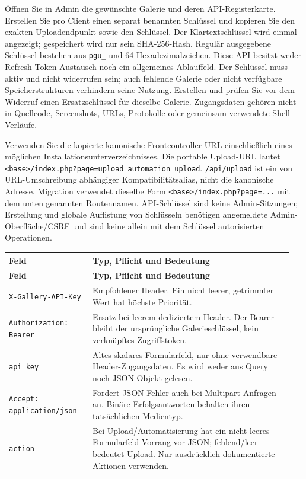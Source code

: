 \documentclass[11pt,a4paper]{article}
\newcommand{\codeword}[1]{\nolinkurl{#1}}
\begin{document}
Öffnen Sie in Admin die gewünschte Galerie und deren API-Registerkarte. Erstellen Sie pro
Client einen separat benannten Schlüssel und kopieren Sie den exakten Uploadendpunkt sowie
den Schlüssel. Der Klartextschlüssel wird einmal angezeigt; gespeichert wird nur sein
SHA-256-Hash. Regulär ausgegebene Schlüssel bestehen aus \codeword{pgu_} und 64
Hexadezimalzeichen. Diese API besitzt weder Refresh-Token-Austausch noch ein allgemeines
Ablauffeld. Der Schlüssel muss aktiv und nicht widerrufen sein; auch fehlende Galerie oder
nicht verfügbare Speicherstrukturen verhindern seine Nutzung. Erstellen und prüfen Sie vor
dem Widerruf einen Ersatzschlüssel für dieselbe Galerie. Zugangsdaten gehören nicht in
Quellcode, Screenshots, URLs, Protokolle oder gemeinsam verwendete Shell-Verläufe.

Verwenden Sie die kopierte kanonische Frontcontroller-URL einschließlich eines möglichen
Installationsunterverzeichnisses. Die portable Upload-URL lautet
\codeword{<base>/index.php?page=upload_automation_upload}. \codeword{/api/upload} ist ein
von URL-Umschreibung abhängiger Kompatibilitätsalias, nicht die kanonische Adresse.
Migration verwendet dieselbe Form \codeword{<base>/index.php?page=...} mit dem unten
genannten Routennamen. API-Schlüssel sind keine Admin-Sitzungen; Erstellung und globale
Auflistung von Schlüsseln benötigen angemeldete Admin-Oberfläche/CSRF und sind keine allein
mit dem Schlüssel autorisierten Operationen.

\begin{longtable}{@{}>{\RaggedRight\arraybackslash}p{0.28\linewidth}>{\RaggedRight\arraybackslash}p{0.67\linewidth}@{}}
\toprule
\textbf{Feld} & \textbf{Typ, Pflicht und Bedeutung} \\
\midrule
\endfirsthead
\toprule
\textbf{Feld} & \textbf{Typ, Pflicht und Bedeutung} \\
\midrule
\endhead
\bottomrule
\endfoot
\codeword{X-Gallery-API-Key} & Empfohlener Header. Ein nicht leerer, getrimmter Wert hat
höchste Priorität. \\
\codeword{Authorization: Bearer} & Ersatz bei leerem dediziertem Header. Der Bearer bleibt
der ursprüngliche Galerieschlüssel, kein verknüpftes Zugriffstoken. \\
\codeword{api_key} & Altes skalares Formularfeld, nur ohne verwendbare Header-Zugangsdaten.
Es wird weder aus Query noch JSON-Objekt gelesen. \\
\codeword{Accept: application/json} & Fordert JSON-Fehler auch bei Multipart-Anfragen an.
Binäre Erfolgsantworten behalten ihren tatsächlichen Medientyp. \\
\codeword{action} & Bei Upload/Automatisierung hat ein nicht leeres Formularfeld Vorrang vor
JSON; fehlend/leer bedeutet Upload. Nur ausdrücklich dokumentierte Aktionen verwenden. \\
\end{longtable}
\end{document}
